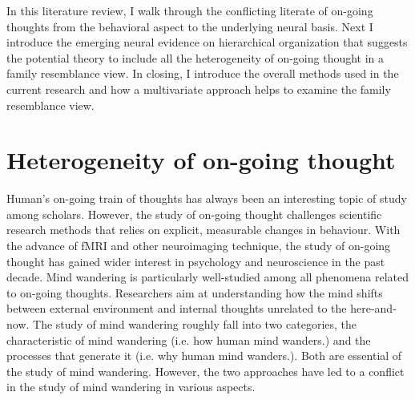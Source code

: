 In this literature review, I walk through the conflicting literate of on-going thoughts from the behavioral aspect to the underlying neural basis. Next I introduce the emerging neural evidence on hierarchical organization that suggests the potential theory to include all the heterogeneity of on-going thought in a family resemblance view. In closing, I introduce the overall methods used in the current research and how a multivariate approach helps to examine the family resemblance view.

\section{Heterogeneity of on-going thought}
\label{ch:intro:heterogeneity}

Human's on-going train of thoughts has always been an interesting topic of study among scholars. However, the study of on-going thought challenges scientific research methods that relies on explicit, measurable changes in behaviour. With the advance of fMRI and other neuroimaging technique, the study of on-going thought has gained wider interest in psychology and neuroscience in the past decade. Mind wandering is particularly well-studied among all phenomena related to on-going thoughts. Researchers aim at understanding how the mind shifts between external environment and internal thoughts unrelated to the here-and-now. The study of mind wandering roughly fall into two categories, the characteristic of mind wandering (i.e. how human mind wanders.) and the processes that generate it (i.e. why human mind wanders.). Both are essential of the study of mind wandering. However, the two approaches have led to a conflict in the study of mind wandering in various aspects.


